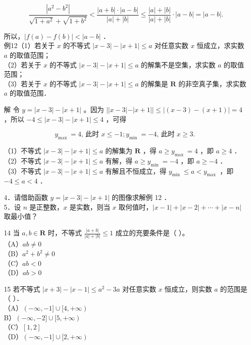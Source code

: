 \documentclass[10pt]{article}
\begin{document}
\[
\frac{\left|a^{2}-b^{2}\right|}{\sqrt{1+a^{2}}+\sqrt{1+b^{2}}}<\frac{|a+b| \cdot|a-b|}{|a|+|b|} \leqslant \frac{|a|+|b|}{|a|+|b|} \cdot|a-b|=|a-b| .
\]

所以，\(|f(a)-f(b)|<|a-b|\) ．\\
例12（1）若关于 \(x\) 的不等式 \(|x-3|-|x+1| \leqslant a\) 对任意实数 \(x\) 恒成立，求实数 \(a\) 的取值范围；\\
（2）若关于 \(x\) 的不等式 \(|x-3|-|x+1| \leqslant a\) 的解集不是空集，求实数 \(a\) 的取值范围；\\
（3）若关于 \(x\) 的不等式 \(|x-3|-|x+1| \leqslant a\) 的解集是 \(\mathbf{R}\) 的非空真子集，求实数 \(a\) 的取值范围．

解 令 \(y=|x-3|-|x+1|\) 。因为 \(||x-3|-|x+1|| \leqslant|(x-3)-(x+1)|=4\) ，所以 \(-4 \leqslant|x-3|-|x+1| \leqslant 4\) ，可得

\[
y_{\text {max }}=4 \text {, 此时 } x \leqslant-1 ; y_{\text {min }}=-4 \text {, 此时 } x \geqslant 3 \text {. }
\]

（1）不等式 \(|x-3|-|x+1| \leqslant a\) 的解集为 \(\mathbf{R}\) ，得 \(a \geqslant y_{\text {max }}=4\) ，即 \(a \geqslant 4\) ．\\
（2）不等式 \(|x-3|-|x+1| \leqslant a\) 有解，得 \(a \geqslant y_{\text {min }}=-4\) ，即 \(a \geqslant-4\) ．\\
（3）不等式 \(|x-3|-|x+1| \leqslant a\) 有解且不恒成立，得 \(y_{\text {min }} \leqslant a<y_{\text {max }}\) ，即 \(-4 \leqslant a<4\) ．

4．请借助函数 \(y=|x-3|-|x+1|\) 的图像求解例 12 ．\\
5．设 \(n\) 是正整数，\(x\) 是实数，则当 \(x\) 取何值时，\(|x-1|+|x-2|+\cdots+|x-n|\)取最小值？

14 当 \(a, b \in \mathbf{R}\) 时，不等式 \(\frac{|a+b|}{|a|+|b|} \leqslant 1\) 成立的充要条件是（ ）。\\
（A）\(a b \neq 0\)\\
（B）\(a^{2}+b^{2} \neq 0\)\\
（C）\(a b<0\)\\
（D）\(a b>0\)

15 若不等式 \(|x+3|-|x-1| \leqslant a^{2}-3 a\) 对任意实数 \(x\) 恒成立，则实数 \(a\) 的范围是 （ ）．\\
（A）\((-\infty,-1] \cup[4,+\infty)\)\\
B）\((-\infty,-2] \cup[5,+\infty)\)\\
（C）\([1,2]\)\\
（D）\((-\infty,-1] \cup[2,+\infty)\)
\end{document}
